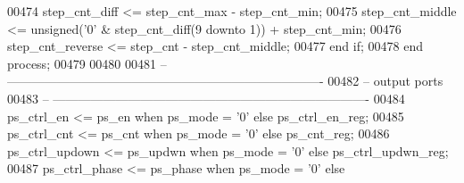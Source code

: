 \begin{DoxyCode}
00474       \textcolor{vhdlchar}{step_cnt_diff}     \textcolor{vhdlchar}{<=} \textcolor{vhdlchar}{step_cnt_max} \textcolor{vhdlchar}{-} \textcolor{vhdlchar}{step_cnt_min};
00475       \textcolor{vhdlchar}{step_cnt_middle}   \textcolor{vhdlchar}{<=} \textcolor{comment}{unsigned}\textcolor{vhdlchar}{(}\textcolor{vhdlchar}{'}\textcolor{vhdllogic}{}\textcolor{vhdllogic}{0}\textcolor{vhdlchar}{'} \textcolor{vhdlchar}{&} \textcolor{vhdlchar}{step_cnt_diff}\textcolor{vhdlchar}{(}\textcolor{vhdllogic}{}\textcolor{vhdllogic}{9} \textcolor{keywordflow}{downto} \textcolor{vhdllogic}{}\textcolor{vhdllogic}{1}\textcolor{vhdlchar}{)}\textcolor{vhdlchar}{)} \textcolor{vhdlchar}{+} \textcolor{vhdlchar}{
      step_cnt_min};
00476       \textcolor{vhdlchar}{step_cnt_reverse}  \textcolor{vhdlchar}{<=} \textcolor{vhdlchar}{step_cnt} \textcolor{vhdlchar}{-} \textcolor{vhdlchar}{step_cnt_middle};
00477    \textcolor{keywordflow}{end} \textcolor{keywordflow}{if};
00478 \textcolor{keywordflow}{end} \textcolor{keywordflow}{process};
00479 
00480 
00481 \textcolor{keyword}{-- ----------------------------------------------------------------------------}
00482 \textcolor{keyword}{-- output ports}
00483 \textcolor{keyword}{-- ----------------------------------------------------------------------------}
00484 \textcolor{vhdlchar}{ps_ctrl_en}     \textcolor{vhdlchar}{<=} \textcolor{vhdlchar}{ps_en}                   \textcolor{keywordflow}{when} \textcolor{vhdlchar}{ps_mode} \textcolor{vhdlchar}{=} \textcolor{vhdlchar}{'}\textcolor{vhdllogic}{}\textcolor{vhdllogic}{0}\textcolor{vhdlchar}{'} \textcolor{keywordflow}{else} \textcolor{vhdlchar}{ps_ctrl_en_reg};
00485 \textcolor{vhdlchar}{ps_ctrl_cnt}    \textcolor{vhdlchar}{<=} \textcolor{vhdlchar}{ps_cnt}                  \textcolor{keywordflow}{when} \textcolor{vhdlchar}{ps_mode} \textcolor{vhdlchar}{=} \textcolor{vhdlchar}{'}\textcolor{vhdllogic}{}\textcolor{vhdllogic}{0}\textcolor{vhdlchar}{'} \textcolor{keywordflow}{else} \textcolor{vhdlchar}{ps_cnt_reg};
00486 \textcolor{vhdlchar}{ps_ctrl_updown} \textcolor{vhdlchar}{<=} \textcolor{vhdlchar}{ps_updwn}                \textcolor{keywordflow}{when} \textcolor{vhdlchar}{ps_mode} \textcolor{vhdlchar}{=} \textcolor{vhdlchar}{'}\textcolor{vhdllogic}{}\textcolor{vhdllogic}{0}\textcolor{vhdlchar}{'} \textcolor{keywordflow}{else} \textcolor{vhdlchar}{
      ps_ctrl_updwn_reg};
00487 \textcolor{vhdlchar}{ps_ctrl_phase}  \textcolor{vhdlchar}{<=} \textcolor{vhdlchar}{ps_phase}                \textcolor{keywordflow}{when} \textcolor{vhdlchar}{ps_mode} \textcolor{vhdlchar}{=} \textcolor{vhdlchar}{'}\textcolor{vhdllogic}{}\textcolor{vhdllogic}{0}\textcolor{vhdlchar}{'} \textcolor{keywordflow}{else} \textcolor{vhdlchar}{
}
\end{DoxyCode}
